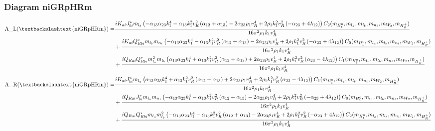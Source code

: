 \documentclass{article}
\begin{document}
\subsubsection{Diagram niGRpHRm}
\begin{align*}
\mathtt{\text{A\_L(\textbackslashtext\{niGRpHRm\})}} = & \frac{i K_{ai} J_{bi}^* m_{l_b} \left(- \alpha_{13} \alpha_{23} k_{1}^{4} - \alpha_{13} k_{1}^{2} v_{R}^{2} \left(\alpha_{12} + \alpha_{13}\right) - 2 \alpha_{23} \rho_{1} v_{R}^{4} + 2 \rho_{1} k_{1}^{2} v_{R}^{2} \left(- \alpha_{23} + 4 \lambda_{12}\right)\right) C_2(m_{H_1^0}, m_{l_a}, m_{l_b}, m_{n_i}, m_{W_2}, m_{H_R^+})}{16 \pi^{2} \rho_{1} k_{1} v_{R}^{4}} \\
& + \frac{i K_{ai} Q_{Rbi}^* m_{l_b} m_{n_i} \left(- \alpha_{13} \alpha_{23} k_{1}^{4} - \alpha_{13} k_{1}^{2} v_{R}^{2} \left(\alpha_{12} + \alpha_{13}\right) - 2 \alpha_{23} \rho_{1} v_{R}^{4} + 2 \rho_{1} k_{1}^{2} v_{R}^{2} \left(- \alpha_{23} + 4 \lambda_{12}\right)\right) C_0(m_{H_1^0}, m_{l_a}, m_{l_b}, m_{n_i}, m_{W_2}, m_{H_R^+})}{16 \pi^{2} \rho_{1} k_{1} v_{R}^{4}} \\
& + \frac{i Q_{Rai} Q_{Rbi}^* m_{l_a}^{2} m_{l_b} \left(\alpha_{13} \alpha_{23} k_{1}^{4} + \alpha_{13} k_{1}^{2} v_{R}^{2} \left(\alpha_{12} + \alpha_{13}\right) + 2 \alpha_{23} \rho_{1} v_{R}^{4} + 2 \rho_{1} k_{1}^{2} v_{R}^{2} \left(\alpha_{23} - 4 \lambda_{12}\right)\right) C_1(m_{H_1^0}, m_{l_a}, m_{l_b}, m_{n_i}, m_{W_2}, m_{H_R^+})}{16 \pi^{2} \rho_{1} k_{1} v_{R}^{4}} 
\end{align*}
\begin{align*}
\mathtt{\text{A\_R(\textbackslashtext\{niGRpHRm\})}} = & \frac{i K_{ai} J_{bi}^* m_{l_a} \left(\alpha_{13} \alpha_{23} k_{1}^{4} + \alpha_{13} k_{1}^{2} v_{R}^{2} \left(\alpha_{12} + \alpha_{13}\right) + 2 \alpha_{23} \rho_{1} v_{R}^{4} + 2 \rho_{1} k_{1}^{2} v_{R}^{2} \left(\alpha_{23} - 4 \lambda_{12}\right)\right) C_1(m_{H_1^0}, m_{l_a}, m_{l_b}, m_{n_i}, m_{W_2}, m_{H_R^+})}{16 \pi^{2} \rho_{1} k_{1} v_{R}^{4}} \\
& + \frac{i Q_{Rai} J_{bi}^* m_{l_a} m_{n_i} \left(- \alpha_{13} \alpha_{23} k_{1}^{4} - \alpha_{13} k_{1}^{2} v_{R}^{2} \left(\alpha_{12} + \alpha_{13}\right) - 2 \alpha_{23} \rho_{1} v_{R}^{4} + 2 \rho_{1} k_{1}^{2} v_{R}^{2} \left(- \alpha_{23} + 4 \lambda_{12}\right)\right) C_0(m_{H_1^0}, m_{l_a}, m_{l_b}, m_{n_i}, m_{W_2}, m_{H_R^+})}{16 \pi^{2} \rho_{1} k_{1} v_{R}^{4}} \\
& + \frac{i Q_{Rai} Q_{Rbi}^* m_{l_a} m_{l_b}^{2} \left(- \alpha_{13} \alpha_{23} k_{1}^{4} - \alpha_{13} k_{1}^{2} v_{R}^{2} \left(\alpha_{12} + \alpha_{13}\right) - 2 \alpha_{23} \rho_{1} v_{R}^{4} + 2 \rho_{1} k_{1}^{2} v_{R}^{2} \left(- \alpha_{23} + 4 \lambda_{12}\right)\right) C_2(m_{H_1^0}, m_{l_a}, m_{l_b}, m_{n_i}, m_{W_2}, m_{H_R^+})}{16 \pi^{2} \rho_{1} k_{1} v_{R}^{4}} 
\end{align*}
\end{document}
